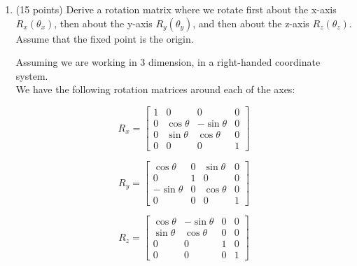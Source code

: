 \documentclass[13pt]{letter}
\begin{document}
\begin{enumerate}
	\item (15 points)
	Derive a rotation matrix where we rotate first about the x-axis $R_x(\theta_x)$, then about the y-axis $R_y(\theta_y)$, and then about the z-axis $R_z(\theta_z)$. Assume that the fixed point is the origin.
	
	Assuming we are working in 3 dimension, in a right-handed coordinate system. \\
	We have the following rotation matrices around each of the axes:

	$$R_x = \left[
	\begin {array}{cccc}
	1 & 0           & 0           & 0 \\
	0 & \cos\theta  & -\sin\theta & 0 \\
	0 & \sin\theta  & \cos\theta  & 0 \\
	0 & 0           & 0           & 1
	\end {array}
	\right]$$
	
	$$R_y = \left[
	\begin {array}{cccc}
	\cos\theta  & 0 & \sin\theta  & 0 \\
	0           & 1 & 0           & 0 \\
	-\sin\theta & 0 & \cos\theta  & 0 \\
	0           & 0 & 0           & 1
	\end {array}
	\right]$$

	$$R_z = \left[
	\begin {array}{cccc}
	\cos\theta & -\sin\theta & 0 & 0 \\
	\sin\theta & \cos\theta  & 0 & 0 \\
	0          & 0           & 1 & 0 \\
	0          & 0           & 0 & 1
	\end {array}
	\right]$$


\end{enumerate}
\end{document}
